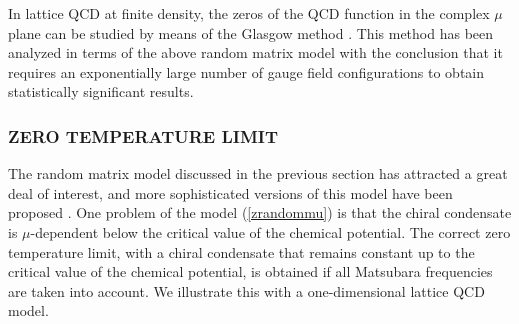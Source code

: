 In lattice QCD at finite density, the zeros of the QCD function in the
complex $\mu$ plane can be studied by means of the Glasgow method
\cite{Barbourqed}.  This method has been analyzed in terms of the
above random matrix model \cite{glasgow} with the conclusion that it
requires an exponentially large number of gauge field configurations
to obtain statistically significant results.


\subsubsection{ZERO TEMPERATURE LIMIT} 

The random matrix model discussed in the previous section has
attracted a great deal of interest, and more sophisticated versions of
this model have been proposed
\cite{Feinnh,Halaszyl,Osbornmu,Nowak,glasgow}.  One problem of the
model (\ref{zrandommu}) is that the chiral condensate is
$\mu$-dependent below the critical value of the chemical potential.
The correct zero temperature limit, with a chiral condensate that
remains constant up to the critical value of the chemical potential,
is obtained if all Matsubara frequencies are taken into account.  We
illustrate this with a one-dimensional lattice QCD model.

